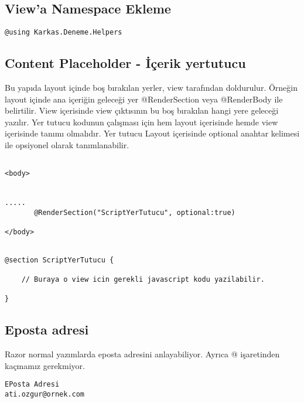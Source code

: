 \documentclass[10pt,a4paper]{article}
\begin{document}
\subsection{View'a Namespace Ekleme}
\begin{lstlisting}[label=code-ViewNamespace,caption=View Namespace Ekleme]
@using Karkas.Deneme.Helpers
\end{lstlisting}



\subsection{Content Placeholder - İçerik yertutucu }

Bu yapıda layout içinde boş bırakılan yerler, view tarafından doldurulur.
Örneğin layout içinde ana içeriğin geleceği yer @RenderSection veya @RenderBody
ile belirtilir.
View içerisinde view çıktısının bu boş bırakılan hangi yere geleceği yazılır.
Yer tutucu kodunun çalışması için hem layout içerisinde hemde view içerisinde tanımı olmalıdır.
Yer tutucu Layout içerisinde optional anahtar kelimesi ile opsiyonel olarak tanımlanabilir.



\begin{lstlisting}[label=code-ContentPlaceHolderLayout,caption=İçerik yertutucu - Layout ]

<body>


.....
       @RenderSection("ScriptYerTutucu", optional:true)

</body>

\end{lstlisting}


\begin{lstlisting}[label=code-ContentPlaceHolderView,caption=İçerik yertutucu - View ]

@section ScriptYerTutucu {

	// Buraya o view icin gerekli javascript kodu yazilabilir.
	
}

\end{lstlisting}


\subsection{Eposta adresi}

Razor normal yazımlarda eposta adresini anlayabiliyor. 
Ayrıca @ işaretinden kaçmamız gerekmiyor.
\begin{lstlisting}[label=code-EmailExample,caption=EPosta Örnek ]
EPosta Adresi
ati.ozgur@ornek.com
\end{lstlisting}
\end{document}
